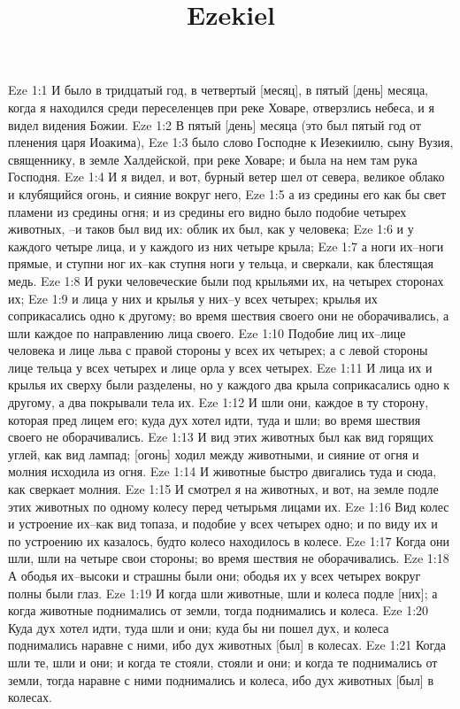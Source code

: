 

\title{Ezekiel}

Eze 1:1  И было в тридцатый год, в четвертый [месяц], в пятый [день] месяца, когда я находился среди переселенцев при реке Ховаре, отверзлись небеса, и я видел видения Божии.
Eze 1:2  В пятый [день] месяца (это был пятый год от пленения царя Иоакима),
Eze 1:3  было слово Господне к Иезекиилю, сыну Вузия, священнику, в земле Халдейской, при реке Ховаре; и была на нем там рука Господня.
Eze 1:4  И я видел, и вот, бурный ветер шел от севера, великое облако и клубящийся огонь, и сияние вокруг него,
Eze 1:5  а из средины его как бы свет пламени из средины огня; и из средины его видно было подобие четырех животных, --и таков был вид их: облик их был, как у человека;
Eze 1:6  и у каждого четыре лица, и у каждого из них четыре крыла;
Eze 1:7  а ноги их--ноги прямые, и ступни ног их--как ступня ноги у тельца, и сверкали, как блестящая медь.
Eze 1:8  И руки человеческие были под крыльями их, на четырех сторонах их;
Eze 1:9  и лица у них и крылья у них--у всех четырех; крылья их соприкасались одно к другому; во время шествия своего они не оборачивались, а шли каждое по направлению лица своего.
Eze 1:10  Подобие лиц их--лице человека и лице льва с правой стороны у всех их четырех; а с левой стороны лице тельца у всех четырех и лице орла у всех четырех.
Eze 1:11  И лица их и крылья их сверху были разделены, но у каждого два крыла соприкасались одно к другому, а два покрывали тела их.
Eze 1:12  И шли они, каждое в ту сторону, которая пред лицем его; куда дух хотел идти, туда и шли; во время шествия своего не оборачивались.
Eze 1:13  И вид этих животных был как вид горящих углей, как вид лампад; [огонь] ходил между животными, и сияние от огня и молния исходила из огня.
Eze 1:14  И животные быстро двигались туда и сюда, как сверкает молния.
Eze 1:15  И смотрел я на животных, и вот, на земле подле этих животных по одному колесу перед четырьмя лицами их.
Eze 1:16  Вид колес и устроение их--как вид топаза, и подобие у всех четырех одно; и по виду их и по устроению их казалось, будто колесо находилось в колесе.
Eze 1:17  Когда они шли, шли на четыре свои стороны; во время шествия не оборачивались.
Eze 1:18  А ободья их--высоки и страшны были они; ободья их у всех четырех вокруг полны были глаз.
Eze 1:19  И когда шли животные, шли и колеса подле [них]; а когда животные поднимались от земли, тогда поднимались и колеса.
Eze 1:20  Куда дух хотел идти, туда шли и они; куда бы ни пошел дух, и колеса поднимались наравне с ними, ибо дух животных [был] в колесах.
Eze 1:21  Когда шли те, шли и они; и когда те стояли, стояли и они; и когда те поднимались от земли, тогда наравне с ними поднимались и колеса, ибо дух животных [был] в колесах.
